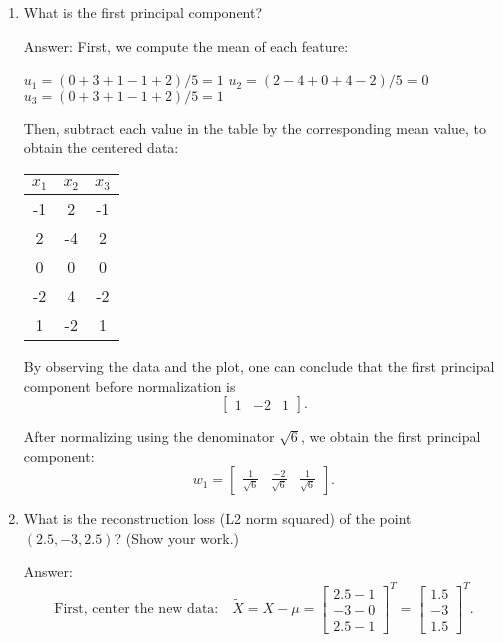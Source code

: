 \documentclass{article}
\newcommand{\blu}[1]{{\textcolor{blu}{#1}}}
\newenvironment{answer}{\par\begingroup\color{gre}Answer: }{\endgroup}
\let\ask\blu
\begin{document}
\begin{enumerate}
  \item \ask{What is the first principal component?}

\begin{answer}
First, we compute the mean of each feature:

$u_1 = (0+3+1-1+2)/5 = 1$ \newline
$u_2 = (2-4+0+4-2)/5 = 0$ \newline
$u_3 = (0+3+1-1+2)/5 = 1$ \newline

Then, subtract each value in the table by the corresponding mean value, to obtain the centered data:

\begin{center}
  \begin{tabular}{ccc}
    $x_1$ & $x_2$ & $x_3$ \\
    \hline
     -1 &  2 &  -1 \\
     2 & -4 &  2 \\
     0 &  0 &  0 \\
    -2 &  4 & -2 \\
     1 & -2 &  1 \\
  \end{tabular}
\end{center}

By observing the data and the plot, one can conclude that the first principal component before normalization is
\[
\begin{bmatrix}
1 & -2 & 1
\end{bmatrix}.
\]

After normalizing using the denominator \(\sqrt{6}\), we obtain the first principal component:
\[ w_1 =
\begin{bmatrix}
\frac{1}{\sqrt{6}} & \frac{-2}{\sqrt{6}} & \frac{1}{\sqrt{6}}
\end{bmatrix}.
\]


\end{answer}

\newpage
  \item \ask{What is the reconstruction loss (L2 norm squared) of the point $(2.5, -3, 2.5)$? (Show your work.)}

\begin{answer}
\[
\text{First, center the new data:} \quad \tilde{X} = X - \mu =
\begin{bmatrix}
2.5 - 1 \\
-3 - 0 \\
2.5 - 1
\end{bmatrix}^T
=
\begin{bmatrix}
1.5 \\
-3 \\
1.5
\end{bmatrix}^T.
\]


\end{answer}
\end{enumerate}
\end{document}
